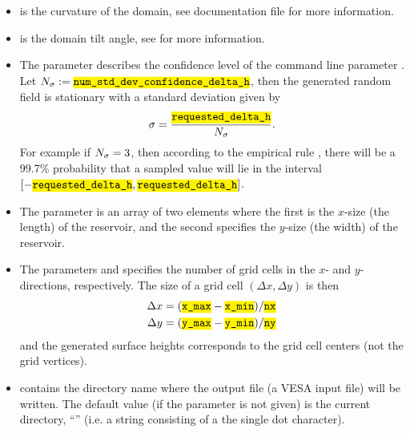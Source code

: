 \documentclass[11pt,a4paper]{amsart}
\begin{document}
\begin{itemize}

\item {} is the curvature of the domain, see
  documentation file \docSetup{} for more information. 

\item {} is the domain tilt angle, see
  \docSetup{} for more information. 

\item The parameter  describes
  the confidence level of the command line parameter \paramAmp{}.
  Let $N_{\stdev} := \jsonParam{num\_std\_dev\_confidence\_delta\_h}$, then
  the generated random field is stationary with a standard
  deviation given by
  \begin{align*}
    \sigma = \frac{\paramAmp}{N_{\stdev}}.
  \end{align*}
  For example if $N_{\sigma} = 3$, then according to the empirical
rule \cite{wik18:ers}, there will be a 99.7\% probability that a sampled value
will lie in the interval $[-\paramAmp, \paramAmp]$.

\item  The parameter  is an array of two
    elements where the first is the $x$-size (the length) of the reservoir, and the
    second specifies the $y$-size (the width) of the reservoir.

\item The parameters  and   specifies the number
    of grid cells in the $x$- and $y$-directions, respectively. The size of a
    grid cell $(\Delta x, \Delta y)$ is then
    \begin{align*}
      \label{eq:4}
      \Delta x = (\jsonParam{x\_max} - \jsonParam{x\_min})/ \jsonParam{nx}\\
      \Delta y = (\jsonParam{y\_max} - \jsonParam{y\_min})/ \jsonParam{ny}
    \end{align*}
    and the generated surface heights corresponds to the grid cell centers
    (not the grid vertices). 

\item {} contains the directory name where the output
  file  (a VESA input file) will be written. The default
  value (if the parameter 
  is not given) is 
  the current directory, ``'' (i.e. a string consisting of a the single
  dot character). 


\end{itemize}
\end{document}
